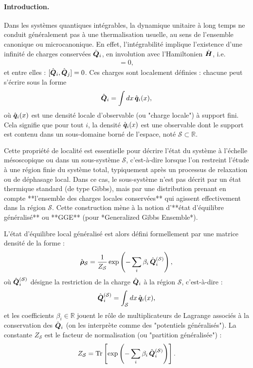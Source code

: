 \paragraph{Introduction.}
Dans les systèmes quantiques intégrables, la dynamique unitaire à long temps ne conduit généralement pas à une thermalisation usuelle, au sens de l’ensemble canonique ou microcanonique. En effet, l'intégrabilité implique l'existence d'une infinité de charges conservées \( \hat{\bm{Q}}_i \), en involution avec l’Hamiltonien \( \hat{\bm{H}} \), i.e.
\begin{eqnarray*}
[\operator{Q}_i, \operator{H}] = 0,
\end{eqnarray*}
et entre elles : \( [\hat{\bm{Q}}_i, \hat{\bm{Q}}_j] = 0 \). Ces charges sont localement définies : chacune peut s’écrire sous la forme
\begin{eqnarray*}
\hat{\bm{Q}}_i = \int dx\, \hat{\bm{q}}_i(x),
\end{eqnarray*}
où \( \hat{\bm{q}}_i(x) \) est une densité locale d’observable (ou "charge locale") à support fini. Cela signifie que pour tout \( i \), la densité \( \hat{\bm{q}}_i(x) \) est une observable dont le support est contenu dans un sous-domaine borné de l’espace, noté \( \mathcal{S} \subset \mathbb{R} \).

Cette propriété de localité est essentielle pour décrire l’état du système à l’échelle mésoscopique ou dans un sous-système \( \mathcal{S} \), c’est-à-dire lorsque l’on restreint l’étude à une région finie du système total, typiquement après un processus de relaxation ou de déphasage local. Dans ce cas, le sous-système n’est pas décrit par un état thermique standard (de type Gibbs), mais par une distribution prenant en compte **l’ensemble des charges locales conservées** qui agissent effectivement dans la région \( \mathcal{S} \). Cette construction mène à la notion d’**état d’équilibre généralisé** ou **GGE** (pour *Generalized Gibbs Ensemble*).

L’état d’équilibre local généralisé est alors défini formellement par une matrice densité de la forme :
\begin{eqnarray*}
\hat{\bm{\rho}}_{\mathcal{S}} = \frac{1}{Z_{\mathcal{S}}} \exp\left( -\sum_i \beta_i\, \hat{\bm{Q}}_i^{(\mathcal{S})} \right),
\end{eqnarray*}
où \( \hat{\bm{Q}}_i^{(\mathcal{S})} \) désigne la restriction de la charge \( \hat{\bm{Q}}_i \) à la région \( \mathcal{S} \), c’est-à-dire :
\begin{eqnarray*}
\hat{\bm{Q}}_i^{(\mathcal{S})} = \int_{\mathcal{S}} dx\, \hat{\bm{q}}_i(x),
\end{eqnarray*}
et les coefficients \( \beta_i \in \mathbb{R} \) jouent le rôle de multiplicateurs de Lagrange associés à la conservation des \( \hat{\bm{Q}}_i \) (on les interprète comme des "potentiels généralisés"). La constante \( Z_{\mathcal{S}} \) est le facteur de normalisation (ou "partition généralisée") :
\begin{eqnarray*}
Z_{\mathcal{S}} = \operatorname{Tr} \left[ \exp\left( -\sum_i \beta_i\, \hat{\bm{Q}}_i^{(\mathcal{S})} \right) \right].
\end{eqnarray*}

